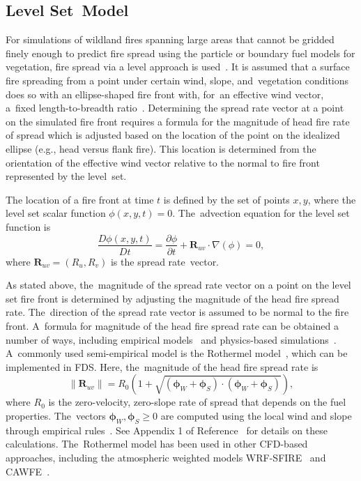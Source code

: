 \documentclass[atmosphere,article,accept,moreauthors,pdftex]{Definitions/mdpi}
\begin{document}
\begin{paracol}{2}
\subsection{Level Set~Model}

For simulations of wildland fires spanning large areas that cannot be gridded finely enough to predict fire spread using the particle or boundary fuel models for vegetation, fire spread via a level approach is used~\cite{Bova:IJWF2015}. It is assumed that a surface fire spreading from a point under certain wind, slope, and~vegetation conditions does so with an ellipse-shaped fire front with, for~an effective wind vector, a~fixed length-to-breadth ratio~\cite{Finney:FARSITE,Bova:IJWF2015}. Determining the spread rate vector at a point on the simulated fire front requires a formula for the magnitude of head fire rate of spread which is adjusted based on the location of the point on the idealized ellipse (e.g., head versus flank fire). This location is determined from the orientation of the effective wind vector relative to the normal to fire front represented by the level~set. 

The location of a fire front at time $t$ is defined by the set of points $x,y$, where the level set scalar function $\phi(x,y,t)=0$. The~advection equation for the level set function is
\begin{equation}
   \frac{D \phi(x,y,t)}{D t} =  \frac{\partial \phi}{\partial t} + \mathbf{R}_{uv} \cdot \nabla (\phi) = 0 \label{eqn:lset},
\end{equation}
where $\mathbf{R}_{uv}=(R_u,R_v)$ is the spread rate~vector. 

As stated above, the~magnitude of the spread rate vector on a point on the level set fire front is determined by adjusting the magnitude of the head fire spread rate. The~direction of the spread rate vector is assumed to be normal to the fire front. A~formula for magnitude of the head fire spread rate can be obtained a number of ways, including empirical models~\cite{Cheney:IJWF1998} and physics-based simulations~\cite{Mell:FBFC2019}. A~commonly used semi-empirical model is the Rothermel model~\cite{Rothermel:1972,Albini:1976}, which can be implemented in FDS. Here, the~magnitude of the head fire spread rate is
\begin{equation}
  \|\mathbf{R}_{uv}\|=R_0 \left(1 + \sqrt{(\boldsymbol{\phi}_W+\boldsymbol{\phi}_S) \cdot (\boldsymbol{\phi}_W+\boldsymbol{\phi}_S) } \right),
\end{equation}
where $R_0$ is the zero-velocity, zero-slope rate of spread that depends on the fuel properties. The~vectors $\boldsymbol{\phi}_W,\boldsymbol{\phi}_S \ge 0$ are computed using the local wind and slope through empirical rules~\cite{Wilson:1980}. See Appendix 1 of Reference~\cite{Bova:IJWF2015} for details on these calculations. The~Rothermel model has been used in other CFD-based approaches, including the atmospheric weighted models WRF-SFIRE~\cite{Mandel:2014} and CAWFE~\cite{Coen:2}. 


\end{paracol}
\end{document}

